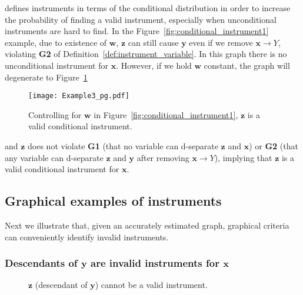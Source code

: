 \documentclass[11pt,review,authoryear]{elsarticle}
\begin{document}
\citet{pearl2009causality} defines instruments in terms of the conditional distribution in order to increase the probability of finding a valid instrument, especially when unconditional instruments are hard to find. In the Figure~\ref{fig:conditional_instrument1} example, due to existence of $\mathbf{w}$, $\mathbf{z}$ can still cause $\mathbf{y}$ even if we remove $\mathbf{x} \rightarrow Y$, violating \textbf{G2} of Definition~\ref{def:instrument_variable}. In this graph there is no unconditional instrument for $\mathbf{x}$. However, if we hold $\mathbf{w}$ constant, the graph will degenerate to Figure~\ref{fig:conditional_instrument2}
%
\begin{figure}[H]
  \centering
  \texttt{[image: Example3\_pg.pdf]}
  \caption{\citep{brito2002generalized} Controlling for $\mathbf{w}$ in Figure~\ref{fig:conditional_instrument1}, $\mathbf{z}$ is a valid conditional instrument.}
  \label{fig:conditional_instrument2}
\end{figure}
%
\noindent
and $\mathbf{z}$ does not violate \textbf{G1} (that no variable can d-separate $\mathbf{z}$ and $\mathbf{x}$) or \textbf{G2} (that any variable can d-separate $\mathbf{z}$ and $\mathbf{y}$ after removing $\mathbf{x} \rightarrow Y$), implying that $\mathbf{z}$ is a valid conditional instrument for $\mathbf{x}$.


\subsection*{Graphical examples of instruments}

Next we illustrate that, given an accurately estimated graph, graphical criteria can conveniently  identify invalid instruments.

\subsubsection*{Descendants of $\mathbf{y}$ are invalid instruments for $\mathbf{x}$}

\begin{figure}[H]
	\centering
	\hfil
	\hfil
	\hfil
	\caption{$\mathbf{z}$ (descendant of $\mathbf{y}$) cannot be a valid instrument.}
	\label{fig:not_instrument2}
\end{figure}
\end{document}
